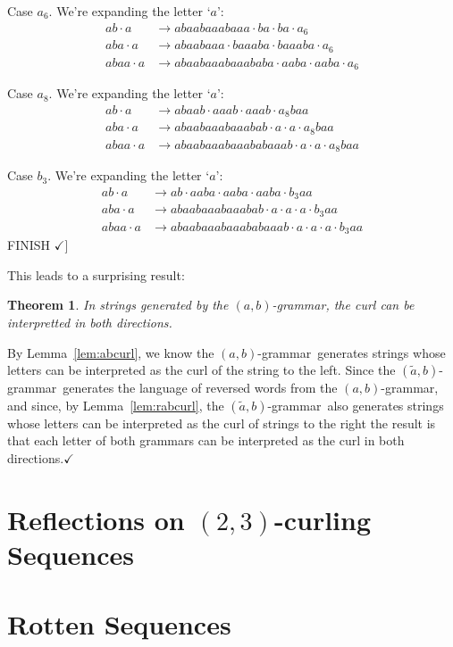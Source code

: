 \documentclass[11pt]{article}
\newcounter{thm}
\newtheorem{theorem}[thm]{Theorem}
\def\QED{$\checkmark$}
\def\ni{\noindent}
\def\ab{$(a,b)$}
\def\twth{$(2,3)$}
\def\abg{\ab-grammar}
\def\rabg{$(\tilde{a},b)$-grammar}
\def\q#1{`$#1$'}
\def\Proof{\ni{\bf Proof:} }
\begin{document}
\ni Case $a_6$. We're expanding the letter \q{a}:
\begin{align*}
ab\cdot a&\rightarrow abaabaaabaaa\cdot ba\cdot ba \cdot a_6\\
aba\cdot a&\rightarrow abaabaaa\cdot baaaba\cdot baaaba \cdot a_6\\
abaa\cdot a&\rightarrow abaabaaabaaababa\cdot aaba\cdot aaba\cdot a_6
\end{align*}

\ni Case $a_8$. We're expanding the letter \q{a}:
\begin{align*}
ab\cdot a&\rightarrow abaab\cdot aaab\cdot aaab\cdot a_8baa\\
aba\cdot a&\rightarrow abaabaaabaaabab\cdot a\cdot a\cdot a_8baa\\
abaa\cdot a&\rightarrow abaabaaabaaababaaab\cdot a\cdot a\cdot a_8baa
\end{align*}

\ni Case $b_3$. We're expanding the letter \q{a}:
\begin{align*}
ab\cdot a&\rightarrow ab\cdot aaba\cdot aaba\cdot aaba\cdot b_3aa\\
aba\cdot a&\rightarrow abaabaaabaaabab\cdot a\cdot a\cdot a\cdot b_3aa\\
abaa\cdot a&\rightarrow abaabaaabaaababaaab\cdot a\cdot a\cdot a\cdot b_3aa
\end{align*}
FINISH
\QED]

This leads to a surprising result:
\begin{theorem}
In strings generated by the \abg, the curl can be interpretted in both directions.
\end{theorem}

\Proof By Lemma~\ref{lem:abcurl}, we know the \abg\ generates strings whose
letters can be interpreted as the curl of the string to the left.  Since
the \rabg\ generates the language of reversed words from the \abg, and since,
by Lemma~\ref{lem:rabcurl}, the \rabg\ also generates strings whose letters
can be interpreted as the curl of strings to the right the result is that
each letter of both grammars can be interpreted as the curl in both directions.\QED


\section{Reflections on \twth-curling Sequences}\label{sect:reflections}

\section{Rotten Sequences}\label{sect:rotten}
\end{document}
